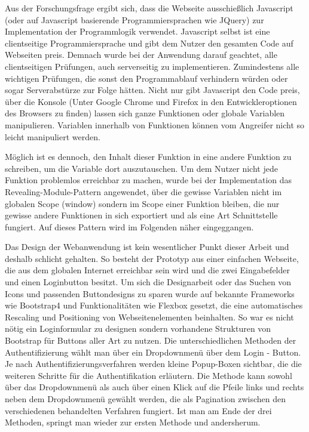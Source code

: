 \begin{enumerate}
Aus der Forschungsfrage ergibt sich, dass die Webseite ausschießlich Javascript (oder auf Javascript basierende Programmiersprachen wie JQuery) zur Implementation der Programmlogik verwendet. Javascript selbst ist eine clientseitige Programmiersprache und gibt dem Nutzer den gesamten Code auf Webseiten preis. Demnach wurde bei der Anwendung darauf geachtet, alle clientseitigen Prüfungen, auch serverseitig zu implementieren. Zumindestens alle wichtigen Prüfungen, die sonst den Programmablauf verhindern würden oder sogar Serverabstürze zur Folge hätten. Nicht nur gibt Javascript den Code preis, über die Konsole (Unter Google Chrome und Firefox in den Entwickleroptionen des Browsers zu finden) lassen sich ganze Funktionen oder globale Variablen manipulieren. Variablen innerhalb von Funktionen können vom Angreifer nicht so leicht manipuliert werden.

Möglich ist es dennoch, den Inhalt dieser Funktion in eine andere Funktion zu schreiben, um die Variable dort auszutauschen. Um dem Nutzer nicht jede Funktion problemlos erreichbar zu machen, wurde bei der Implementation das Revealing-Module-Pattern angewendet, über die gewisse Variablen nicht im globalen Scope (window) sondern im Scope einer Funktion bleiben, die nur gewisse andere Funktionen in sich exportiert und als eine Art Schnittstelle fungiert. Auf dieses Pattern wird im Folgenden näher eingeggangen.

Das Design der Webanwendung ist kein wesentlicher Punkt dieser Arbeit und deshalb schlicht gehalten. So besteht der Prototyp aus einer einfachen Webseite, die aus dem globalen Internet erreichbar sein wird und die zwei Eingabefelder und einen Loginbutton besitzt. Um sich die Designarbeit oder das Suchen von Icons und passenden Buttondesigns zu sparen wurde auf bekannte Frameworks wie Bootstrap4 und Funktionalitäten wie Flexbox gesetzt, die eine automatisches Rescaling und Positioning von Webseitenelementen beinhalten. So war es nicht nötig ein Loginformular zu designen sondern vorhandene Strukturen von Bootstrap für Buttons aller Art zu nutzen. Die unterschiedlichen Methoden der Authentifizierung wählt man über ein Dropdownmenü über dem Login - Button. Je nach Authentifizierungsverfahren werden kleine Popup-Boxen sichtbar, die die weiteren Schritte für die Authentifikation erläutern. Die Methode kann sowohl über das Dropdownmenü als auch über einen Klick auf die Pfeile links und rechts neben dem Dropdownmenü gewählt werden, die als Pagination zwischen den verschiedenen behandelten Verfahren fungiert. Ist man am Ende der drei Methoden, springt man wieder zur ersten Methode und andersherum.


\end{enumerate}
